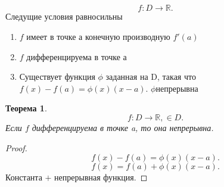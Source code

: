 \documentclass[a4paper]{article}
\newtheorem{theorem}{Теорема}
\begin{document}
\subsection{}
\[
	f : D \to \mathbb{R}
	.\]
Следущие условия равносильны
\begin{enumerate}
	\item $f$ имеет в точке а конечную производную  $f'(a)$
	\item  $f$ дифференцируема в точке а
	\item Существует функция  $\phi$ заданная на D, такая что  $f(x) - f(a) = \phi(x)(x - a)$.  $\phi$непрерывна
\end{enumerate}
\begin{theorem}
	\[
		f: D \to \mathbb{R},  \in D
		.\]
	Если $f$ дифференцируема в точке a, то она непрерывна.
\end{theorem}
\begin{proof}
	\[
		f(x) - f(a) = \phi(x)(x-a)
		.\]
	\[
		f(x) = f(a) + \phi(x)(x - a)
		.\]
	Константа $+$ непрерывная функция.
\end{proof}
\end{document}
